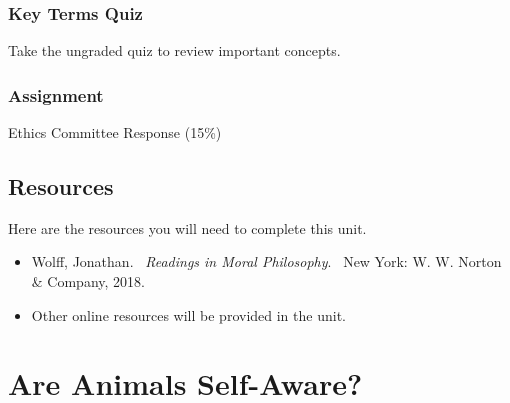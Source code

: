 \documentclass[
]{book}
\providecommand{\tightlist}{%
  \setlength{\itemsep}{0pt}\setlength{\parskip}{0pt}}
\begin{document}
\begin{reflect}
\hypertarget{key-terms-quiz-5}{%
\subsubsection*{Key Terms Quiz}\label{key-terms-quiz-5}}

Take the ungraded quiz to review important concepts.

\hypertarget{assignment-4}{%
\subsubsection*{\texorpdfstring{\textbf{Assignment}}{Assignment}}\label{assignment-4}}

Ethics Committee Response (15\%)
\end{reflect}

\hypertarget{resources-6}{%
\subsection*{Resources}\label{resources-6}}

Here are the resources you will need to complete this unit.

\begin{itemize}
\tightlist
\item
  Wolff, Jonathan. ~\emph{Readings in Moral Philosophy}. ~New York: W. W. Norton \& Company, 2018.\\
\item
  Other online resources will be provided in the unit.
\end{itemize}

\hypertarget{are-animals-self-aware}{%
\section*{Are Animals Self-Aware?}\label{are-animals-self-aware}}
\end{document}
